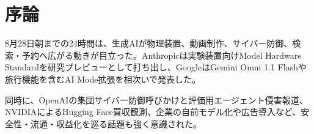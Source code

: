 \section{序論}
8月28日朝までの24時間は、生成AIが物理装置、動画制作、サイバー防御、検索・予約へ広がる動きが目立った。Anthropicは実験装置向けModel Hardware Standardを研究プレビューとして打ち出し、GoogleはGemini Omni 1.1 Flashや旅行機能を含むAI Mode拡張を相次いで発表した。

同時に、OpenAIの集団サイバー防御呼びかけと評価用エージェント侵害報道、NVIDIAによるHugging Face買収観測、企業の自前モデル化や広告導入など、安全性・流通・収益化を巡る話題も強く意識された。
